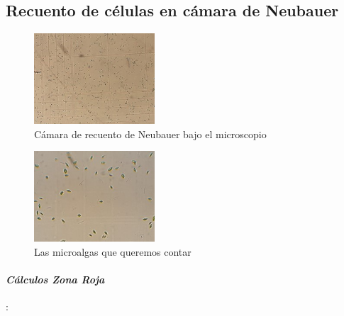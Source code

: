 \documentclass[journal,transmag]{IEEEtran}
\begin{document}
 \subsection{\textbf{Recuento de células en cámara de Neubauer}} 
  
    \begin{figure}[!h] 
	\center 
	\includegraphics[width=4.5cm]{I17.jpg} 
	\caption{Cámara de recuento de Neubauer bajo el microscopio} 
	\label{I1}
	\end{figure}
	\begin{figure}[!h] 
	\center 
	\includegraphics[width=4.5cm]{I18.jpg} 
	\caption{Las microalgas que queremos contar} 
	\label{I1}
	\end{figure}
	
	\vspace{50mm} 
\paragraph{\large \textit{\textbf{Cálculos Zona Roja}}}: 
\end{document}
